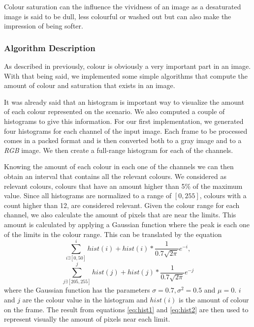 Colour saturation can the influence the vividness of an image as a desaturated image is said to be dull, less colourful or washed out but can also make the impression of being softer. 


\subsubsection{Algorithm Description}

As described in previously, colour is obviously a very important part in an image. With that being said, we implemented some simple algorithms that compute the amount of colour and saturation that exists in an image.

It was already said that an histogram is important way to visualize the amount of each colour represented on the scenario. We also computed a couple of histograms to give this information. For our first implementation, we generated four histograms for each channel of the input image. Each frame to be processed comes in a packed format and is then converted both to a gray image and to a \emph{RGB} image. We then create a full-range histogram for each of the channels.

Knowing the amount of each colour in each one of the channels we can then obtain an interval that contains all the relevant colours. We considered as relevant colours, colours that have an amount higher than 5\% of the maximum value. Since all histograms are normalized to a range of $[0,255]$, colours with a count higher than 12, are considered relevant. Given the colour range for each channel, we also calculate the amount of pixels that are near the limits. This amount is calculated by applying a Gaussian function where the peak is each one of the limits in the colour range. This can be translated by the equation
\begin{equation}
	\sum_{i \exists [0,50]}^{i}hist(i) + hist(i)*\frac{1}{0.7\sqrt{2\pi}}e^{-i},
	\label{eq:hist1}
\end{equation}
\begin{equation}
	\sum_{j \exists [205,255]}^{j}hist(j) + hist(j)*\frac{1}{0.7\sqrt{2\pi}}e^{-j}
	\label{eq:hist2}
\end{equation}
where the Gaussian function has the parameters $\sigma = 0.7, \sigma^{2} = 0.5$ and $\mu = 0$. $i$ and $j$ are the colour value in the histogram and $hist(i)$ is the amount of colour on the frame. The result from equations \ref{eq:hist1} and \ref{eq:hist2} are then used to represent visually the amount of pixels near each limit. 

